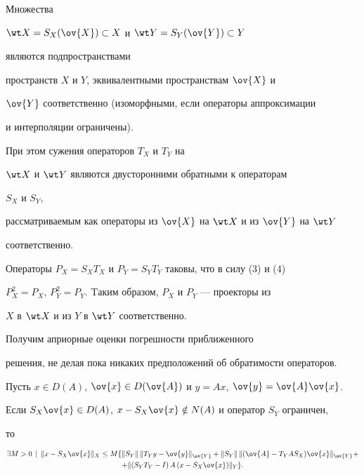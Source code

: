 Множества


$\wt X=S_X(\ov{X})\subset X$ и $\wt Y=S_Y(\ov{Y})\subset Y$


являются подпространствами


пространств $X$ и $Y$, эквивалентными пространствам $\ov{X}$ и


$\ov{Y}$ соответственно (изоморфными, если операторы аппроксимации


и интерполяции ограничены).


При этом сужения операторов $T_X$ и $T_Y$ на


$\wt X$ и $\wt Y$ являются двусторонними обратными к операторам


$S_X$ и $S_Y$,


рассматриваемым как операторы из $\ov{X}$ на $\wt X$ и из $\ov{Y}$ на $\wt Y$


соответственно.





Операторы $P_X=S_XT_X$ и $P_Y=S_YT_Y$ таковы, что в силу (3) и (4)


$P^2_X=P_X$, $P^2_Y=P_Y$. Tаким образом, $P_X$ и $P_Y$ --- проекторы из


$X$ в $\wt X$ и из $Y$ в $\wt Y$ соответственно.





Получим априорные оценки погрешности приближенного


решения, не делая пока никаких предположений об обратимости операторов.





\begin{thm}


Пусть $x\in D(A)$, $\ov{x}\in D(\ov{A})$ и $y=Ax$, $\ov{y}=\ov{A}\ov{x}$.


Если $S_X\ov{x}\in D(A)$, $x-S_X\ov{x}\notin N(A)$ и оператор $S_Y$ ограничен,


то


\begin{multline}


\exists M>0\, \mid\,


\nr{x-S_X\ov{x}}_X \leq M \{ \nr{S_Y}\,\nr{T_Yy-\ov{y}}_{\ov{Y}}


 + \nr{S_Y}\,\nr{(\ov{A}-T_YAS_X)\ov{x}}_{\ov{Y}} + \\


%


+ \nr{(S_YT_Y-I)\,A\,(x-S_X\ov{x})}_Y \}.


\end{multline}


\end{thm}





